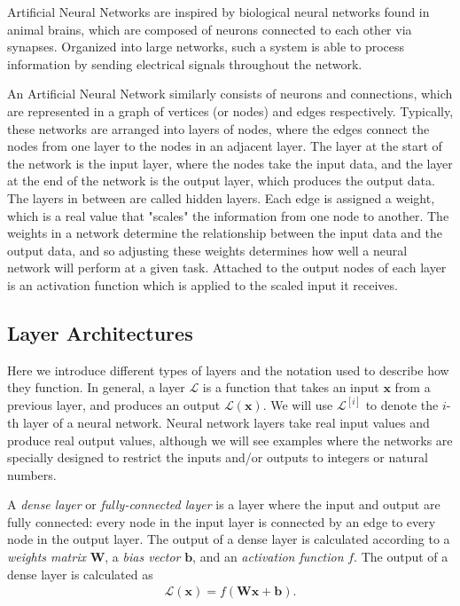 \documentclass{somasmsc}
\begin{document}
Artificial Neural Networks are inspired by biological neural networks found in animal brains, which are composed of neurons connected to each other via synapses. Organized into large networks, such a system is able to process information by sending electrical signals throughout the network.

An Artificial Neural Network similarly consists of neurons and connections, which are represented in a graph of vertices (or nodes) and edges respectively. Typically, these networks are arranged into layers of nodes, where the edges connect the nodes from one layer to the nodes in an adjacent layer. The layer at the start of the network is the input layer, where the nodes take the input data, and the layer at the end of the network is the output layer, which produces the output data. The layers in between are called hidden layers. Each edge is assigned a weight, which is a real value that "scales" the information from one node to another. The weights in a network determine the relationship between the input data and the output data, and so adjusting these weights determines how well a neural network will perform at a given task. Attached to the output nodes of each layer is an activation function which is applied to the scaled input it receives.


\subsection{Layer Architectures}

Here we introduce different types of layers and the notation used to describe how they function. In general, a layer $\mathcal{L}$ is a function that takes an input $\pmb{x}$ from a previous layer, and produces an output $\mathcal{L}\left(\pmb{x}\right)$. We will use $\mathcal{L}^{\left[i\right]}$ to denote the $i$-th layer of a neural network. Neural network layers take real input values and produce real output values, although we will see examples where the networks are specially designed to restrict the inputs and/or outputs to integers or natural numbers.

A \textit{dense layer} or \textit{fully-connected layer} is a layer where the input and output are fully connected: every node in the input layer is connected by an edge to every node in the output layer. The output of a dense layer is calculated according to a \textit{weights matrix} $\mathbf{W}$, a \textit{bias vector} $\pmb{b}$, and an \textit{activation function} $f$. The output of a dense layer is calculated as
\begin{align*}
\mathcal{L}\left(\pmb{x}\right) = f\left(\mathbf{W}\pmb{x} + \pmb{b}\right).
\end{align*}
\end{document}
